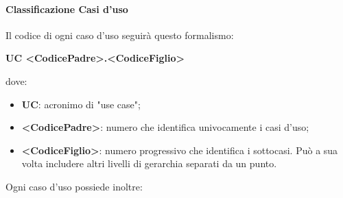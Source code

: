 			\paragraph{Classificazione Casi d’uso}
				Il codice di ogni caso d'uso seguirà questo formalismo:
				\begin{center}
					\textbf{UC <CodicePadre>.<CodiceFiglio>}
				\end{center}
				dove:
				\begin{itemize}
					\item\textbf{UC}: acronimo di "use case";
					\item\textbf{<CodicePadre>}: numero che identifica univocamente i casi d'uso;
					\item\textbf{<CodiceFiglio>}: numero progressivo che identifica i sottocasi. Può a sua volta includere altri livelli di gerarchia separati da un punto.
				\end{itemize}
				Ogni caso d’uso possiede inoltre:
